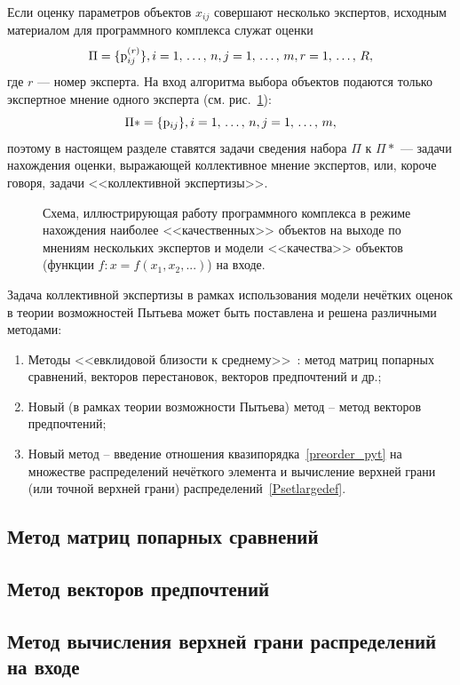\label{collective_global}

Если оценку параметров объектов $x_{ij}$ совершают несколько экспертов, исходным материалом для программного комплекса служат оценки 
\begin{equation}
\label{Psetlargedef}
	\Pi = \{{\mathrm{p}}_{ij}^{(r)}\}, i = 1,\, \ldots,\, n, j = 1,\, \ldots,\, m, r = 1,\, \ldots,\, R, 
\end{equation}
где $r$ --- номер эксперта. На вход алгоритма выбора объектов подаются только экспертное  мнение одного эксперта (см. рис.~\ref{ris:program_global}): 
\begin{equation*}
	\Pi* = \{{\mathrm{p}}_{ij}\},  i = 1,\, \ldots,\, n, j = 1,\, \ldots,\, m,
\end{equation*}		
 поэтому в настоящем разделе ставятся задачи сведения набора $\Pi$ к $\Pi*$ --- задачи нахождения  оценки, выражающей коллективное мнение экспертов, или, короче говоря, задачи <<коллективной экспертизы>>. 

\begin{figure}[h]
\caption{\small Схема, иллюстрирующая работу программного комплекса в режиме нахождения наиболее <<качественных>> объектов на выходе по мнениям нескольких экспертов и модели <<качества>> объектов (функции $f: x = f(x_1, x_2, ...)$) на входе. }
\label{ris:program_global}
\end{figure}

Задача коллективной экспертизы в рамках использования модели нечётких оценок в теории возможностей Пытьева может быть поставлена и решена различными методами:
	\begin{enumerate}
		\item Методы <<евклидовой близости к среднему>>~\cite{pytyev_experts}: метод матриц попарных сравнений, векторов перестановок, векторов предпочтений и др.;
		\item Новый (в рамках теории возможности Пытьева) метод -- метод векторов предпочтений;
		\item Новый метод -- введение отношения квазипорядка~\ref{preorder_pyt}  на множестве распределений нечёткого элемента и вычисление верхней грани (или  точной верхней грани) распределений~\ref{Psetlargedef}.
	\end{enumerate} 
	
\subsection{Метод матриц попарных сравнений}


\subsection{Метод векторов предпочтений}


\subsection{Метод вычисления верхней грани распределений на входе}


	
	